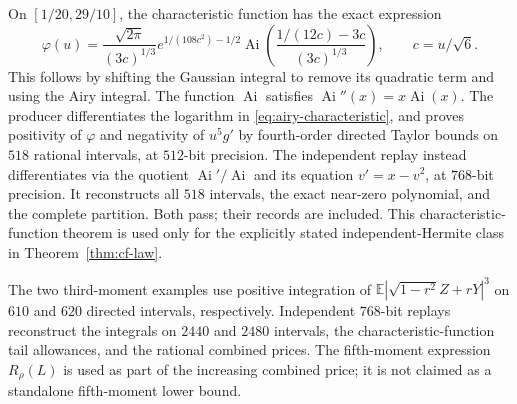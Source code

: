 \documentclass[11pt]{article}
\newcommand{\E}{\mathbb E}
\begin{document}
On $[1/20,29/10]$, the characteristic function has the exact expression
\begin{equation}\label{eq:airy-characteristic}
 \varphi(u)=\frac{\sqrt{2\pi}}{(3c)^{1/3}}
 e^{1/(108c^2)-1/2}
 \operatorname{Ai}\!\left(\frac{1/(12c)-3c}{(3c)^{1/3}}\right),
 \qquad c=u/\sqrt6.
\end{equation}
This follows by shifting the Gaussian integral to remove its quadratic term and using the Airy integral. The function $\operatorname{Ai}$ satisfies $\operatorname{Ai}''(x)=x\operatorname{Ai}(x)$. The producer differentiates the logarithm in \eqref{eq:airy-characteristic}, and proves positivity of $\varphi$ and negativity of $u^5g'$ by fourth-order directed Taylor bounds on $518$ rational intervals, at $512$-bit precision. The independent replay instead differentiates via the quotient $\operatorname{Ai}'/\operatorname{Ai}$ and its equation $v'=x-v^2$, at $768$-bit precision. It reconstructs all $518$ intervals, the exact near-zero polynomial, and the complete partition. Both pass; their records are included. This characteristic-function theorem is used only for the explicitly stated independent-Hermite class in Theorem~\ref{thm:cf-law}.

The two third-moment examples use positive integration of $\E|\sqrt{1-r^2}Z+rY|^3$ on $610$ and $620$ directed intervals, respectively. Independent $768$-bit replays reconstruct the integrals on $2440$ and $2480$ intervals, the characteristic-function tail allowances, and the rational combined prices. The fifth-moment expression $R_\rho(L)$ is used as part of the increasing combined price; it is not claimed as a standalone fifth-moment lower bound.
\end{document}
